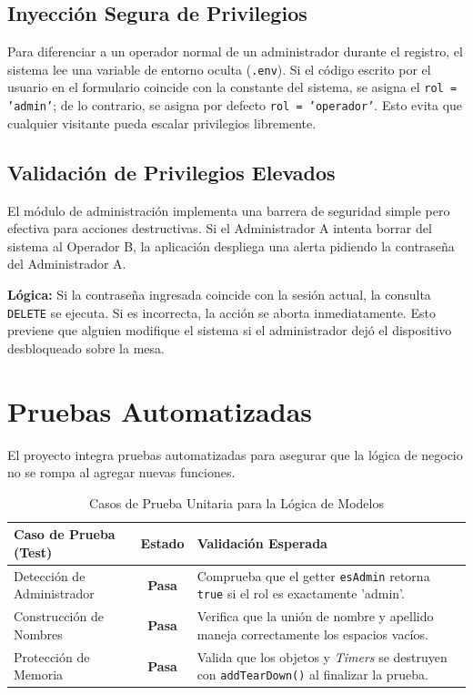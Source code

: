\documentclass[11pt,a4paper]{article}
\begin{document}
\subsection{Inyección Segura de Privilegios}

Para diferenciar a un operador normal de un administrador durante el registro, el sistema lee una variable de entorno oculta (\texttt{.env}). Si el código escrito por el usuario en el formulario coincide con la constante del sistema, se asigna el \texttt{rol = 'admin'}; de lo contrario, se asigna por defecto \texttt{rol = 'operador'}. Esto evita que cualquier visitante pueda escalar privilegios libremente.

\subsection{Validación de Privilegios Elevados}

El módulo de administración implementa una barrera de seguridad simple pero efectiva para acciones destructivas. Si el Administrador A intenta borrar del sistema al Operador B, la aplicación despliega una alerta pidiendo la contraseña del Administrador A. 

\textbf{Lógica:} Si la contraseña ingresada coincide con la sesión actual, la consulta \texttt{DELETE} se ejecuta. Si es incorrecta, la acción se aborta inmediatamente. Esto previene que alguien modifique el sistema si el administrador dejó el dispositivo desbloqueado sobre la mesa.

\section{Pruebas Automatizadas}

El proyecto integra pruebas automatizadas para asegurar que la lógica de negocio no se rompa al agregar nuevas funciones.

\begin{table}[htpb]
    \centering
    \caption{Casos de Prueba Unitaria para la Lógica de Modelos}
    \begin{tabularx}{\textwidth}{l c X}
        \toprule
        \textbf{Caso de Prueba (Test)} & \textbf{Estado} & \textbf{Validación Esperada} \\
        \midrule
        Detección de Administrador & \textcolor{green!60!black}{\textbf{Pasa}} & Comprueba que el getter \texttt{esAdmin} retorna \texttt{true} si el rol es exactamente 'admin'. \\
        Construcción de Nombres & \textcolor{green!60!black}{\textbf{Pasa}} & Verifica que la unión de nombre y apellido maneja correctamente los espacios vacíos. \\
        Protección de Memoria & \textcolor{green!60!black}{\textbf{Pasa}} & Valida que los objetos y \textit{Timers} se destruyen con \texttt{addTearDown()} al finalizar la prueba.\\
        \bottomrule
    \end{tabularx}
\end{table}
\end{document}

